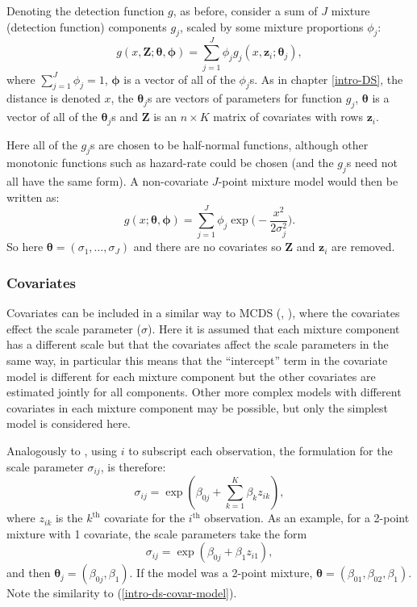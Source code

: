 Denoting the detection function $g$, as before, consider a sum of $J$ mixture (detection function) components $g_j$, scaled by some mixture proportions $\phi_j$:
\begin{equation}
g(x,\mathbf{Z}; \bm{\theta}, \bm{\phi}) = \sum_{j=1}^J \phi_j g_j(x,\mathbf{z}_i; \bm{\theta}_j),
\label{mix-detfct}
\end{equation}
where $\sum_{j=1}^J \phi_j = 1$, $\bm{\phi}$ is a vector of all of the $\phi_j$s. As in chapter \ref{intro-DS}, the distance is denoted $x$, the $\bm{\theta}_j$s are vectors of parameters for function $g_j$, $\bm{\theta}$ is a vector of all of the $\bm{\theta}_j$s and $\mathbf{Z}$ is an $n\times K$ matrix of covariates with rows $\mathbf{z}_i$.

Here all of the $g_j$s are chosen to be half-normal functions, although other monotonic functions such as hazard-rate could be chosen (and the $g_j$s need not all have the same form). A non-covariate $J$-point mixture model would then be written as:
\begin{equation*}
g(x; \bm{\theta}, \bm{\phi}) = \sum_{j=1}^J \phi_j \exp \Big( - \frac{x^2}{2\sigma_j^2} \Big).
\end{equation*}
So here $\bm{\theta} = (\sigma_1, \ldots, \sigma_J)$ and there are no covariates so $\mathbf{Z}$ and $\mathbf{z}_i$ are removed.

\subsubsection{Covariates}

Covariates can be included in a similar way to MCDS (, \cite[Chapter 3]{ADS}), where the covariates effect the scale parameter ($\sigma$). Here it is assumed that each mixture component has a different scale but that the covariates affect the scale parameters in the same way, in particular this means that the ``intercept'' term in the covariate model is different for each mixture component but the other covariates are estimated jointly for all components. Other more complex models with different covariates in each mixture component may be possible, but only the simplest model is considered here.

Analogously to , using $i$ to subscript each observation, the formulation for the scale parameter $\sigma_{ij}$, is therefore:
\begin{equation*}
\sigma_{ij} = \exp( \beta_{0j} + \sum_{k=1}^K \beta_k z_{ik}),
\end{equation*}
where $z_{ik}$ is the $k^\text{th}$ covariate for the $i^\text{th}$ observation. As an example, for a 2-point mixture with 1 covariate, the scale parameters take the form
\begin{equation*}
\sigma_{ij} = \exp( \beta_{0j} + \beta_1 z_{i1}),
\end{equation*}
and then $\bm{\theta}_j = (\beta_{0j}, \beta_1)$. If the model was a 2-point mixture, $\bm{\theta} = (\beta_{01}, \beta_{02}, \beta_1)$. Note the similarity to (\ref{intro-ds-covar-model}).

